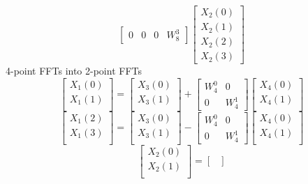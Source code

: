 \documentclass[journal,12pt,twocolumn]{IEEEtran}
\renewcommand\thesection{\arabic{section}}
\begin{document}
\begin{enumerate}[label=\arabic*.,ref=\thesection.\theenumi]
\begin{equation}
\begin{bmatrix}
0 & 0 & 0 & W^{3}_{8}
\end{bmatrix}
\begin{bmatrix}
X_{2}(0) \\ 
X_{2}(1) \\ 
X_{2}(2) \\
X_{2}(3)
\end{bmatrix}
\end{equation}
4-point FFTs into 2-point FFTs
\begin{equation}
\begin{bmatrix}
X_{1}(0) \\ 
X_{1}(1)\\ 
\end{bmatrix}
=
\begin{bmatrix}
X_{3}(0) \\ 
X_{3}(1)\\ 
\end{bmatrix}
+
\begin{bmatrix}
W^{0}_{4} & 0\\
0 & W^{1}_{4}
\end{bmatrix}
\begin{bmatrix}
X_{4}(0) \\ 
X_{4}(1) \\ 
\end{bmatrix}
\end{equation}
\begin{equation}
\begin{bmatrix}
X_{1}(2) \\ 
X_{1}(3)\\ 
\end{bmatrix}
=
\begin{bmatrix}
X_{3}(0) \\ 
X_{3}(1)\\ 
\end{bmatrix}
-
\begin{bmatrix}
W^{0}_{4} & 0\\
0 & W^{1}_{4}
\end{bmatrix}
\begin{bmatrix}
X_{4}(0) \\ 
X_{4}(1) \\ 
\end{bmatrix}
\end{equation}
\begin{equation}
\begin{bmatrix}
X_{2}(0) \\ 
X_{2}(1)\\ 
\end{bmatrix}
=
\begin{bmatrix}

\end{bmatrix}
\end{equation}
\end{enumerate}
\end{document}
